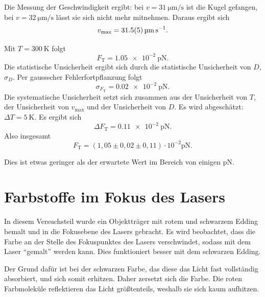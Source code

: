Die Messung der Geschwindigkeit ergibt: bei $v=\SI{31}{\micro\meter\per\second}$ ist die Kugel gefangen, bei $v=\SI{32}{\micro\meter\per\second}$ lässt sie sich nicht mehr mitnehmen. Daraus ergibt sich
\begin{equation}
 v_{\textrm{max}} = \SI{31,5\pm0,5}{\micro\meter\per\second}.
\end{equation}

Mit $T=\SI{300}{\kelvin}$ folgt
\begin{equation}
 F_{\textrm{T}} =  \SI{1,05e-2}{\pico\newton}.
\end{equation}
Die statistische Unsicherheit ergibt sich durch die statistische Unsicherheit von $D$, $\sigma_{D}$. Per gaussscher Fehlerfortpflanzung folgt
\begin{equation}
 \sigma_{F_{\textrm{T}}} = \SI{0,02e-2}{\pico\newton}.
\end{equation}
Die systematische Unsicherheit setzt sich zusammen aus der Unsicherheit von $T$, der Unsicherheit von $v_{\textrm{max}}$ und der Unsicherheit von $D$. Es wird abgeschätzt: $\Delta T = \SI{5}{\kelvin}$.
Es ergibt sich
\begin{equation}
 \Delta F_{\textrm{T}} = \SI{0,11e-2}{\pico\newton}.
\end{equation}
Also insgesamt
\begin{equation}
 F_{\textrm{T}} = (1,05\pm0,02\pm0,11)\cdot 10^{-2} \si{\pico\newton}.
\end{equation}

Dies ist etwas geringer als der erwartete Wert im Bereich von einigen $\si{\pico\newton}$.

\section{Farbstoffe im Fokus des Lasers}

In diesem Versuchsteil wurde ein Objektträger mit rotem und schwarzem Edding bemalt und in die Fokusebene des Lasers gebracht. Es wird beobachtet, dass die Farbe an der Stelle des Fokuspunktes des Lasers verschwindet, sodass mit dem Laser ``gemalt'' werden kann. Dies funktioniert besser mit dem schwarzen Edding.

Der Grund dafür ist bei der schwarzen Farbe, das diese das Licht fast vollständig absorbiert, und sich somit erhitzen. Daher zersetzt sich die Farbe. Die roten Farbmoleküle reflektieren das Licht größtenteils, weshalb sie sich kaum aufhitzen. 

